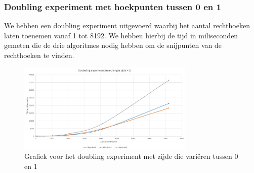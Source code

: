 \documentclass[11pt,a4paper,titlepage]{article}
\begin{document}
			\subsubsection{Doubling experiment met hoekpunten tussen 0 en 1}
				We hebben een doubling experiment uitgevoerd waarbij het aantal rechthoeken laten toenemen vanaf 1 tot 8192.  We hebben hierbij de tijd in miliseconden gemeten die de drie algoritmes nodig hebben om de snijpunten van de rechthoeken te vinden.
				\begin{figure}[H]
				\centering
				\includegraphics[width=0.75\textwidth]{zijde1.JPG}
				\caption{\label{fig:zijde1}Grafiek voor het doubling experiment met zijde die variëren tussen 0 en 1}
				\end{figure}
\end{document}
